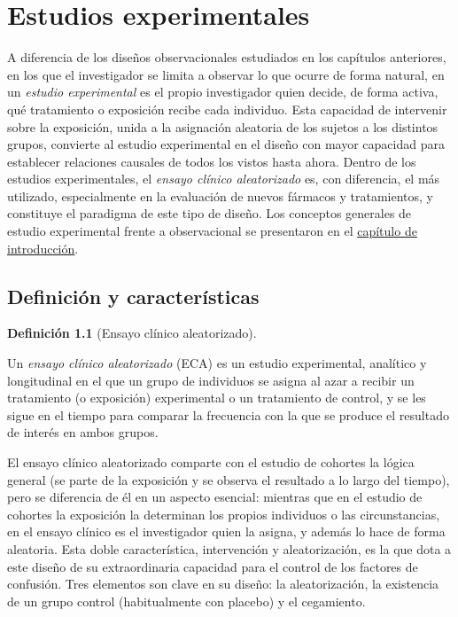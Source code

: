\documentclass[
  spanish,
  a4paper,
]{scrreport}
\theoremstyle{definition}
\theoremstyle{definition}
\newtheorem{definition}{Definición}[chapter]
\theoremstyle{remark}
\begin{document}
\chapter{Estudios experimentales}\label{estudios-experimentales}

A diferencia de los diseños observacionales estudiados en los capítulos
anteriores, en los que el investigador se limita a observar lo que
ocurre de forma natural, en un \emph{estudio experimental} es el propio
investigador quien decide, de forma activa, qué tratamiento o exposición
recibe cada individuo. Esta capacidad de intervenir sobre la exposición,
unida a la asignación aleatoria de los sujetos a los distintos grupos,
convierte al estudio experimental en el diseño con mayor capacidad para
establecer relaciones causales de todos los vistos hasta ahora. Dentro
de los estudios experimentales, el \emph{ensayo clínico aleatorizado}
es, con diferencia, el más utilizado, especialmente en la evaluación de
nuevos fármacos y tratamientos, y constituye el paradigma de este tipo
de diseño. Los conceptos generales de estudio experimental frente a
observacional se presentaron en el
\hyperref[introducciuxf3n-a-los-tipos-de-estudios-estaduxedsticos]{capítulo
de introducción}.

\section{Definición y
características}\label{definiciuxf3n-y-caracteruxedsticas-5}

\begin{definition}[Ensayo clínico
aleatorizado]\protect\hypertarget{def-experimentales-ensayo-clinico-aleatorizado}{}\label{def-experimentales-ensayo-clinico-aleatorizado}

Un \emph{ensayo clínico aleatorizado} (ECA) es un estudio experimental,
analítico y longitudinal en el que un grupo de individuos se asigna al
azar a recibir un tratamiento (o exposición) experimental o un
tratamiento de control, y se les sigue en el tiempo para comparar la
frecuencia con la que se produce el resultado de interés en ambos
grupos.

\end{definition}

El ensayo clínico aleatorizado comparte con el estudio de cohortes la
lógica general (se parte de la exposición y se observa el resultado a lo
largo del tiempo), pero se diferencia de él en un aspecto esencial:
mientras que en el estudio de cohortes la exposición la determinan los
propios individuos o las circunstancias, en el ensayo clínico es el
investigador quien la asigna, y además lo hace de forma aleatoria. Esta
doble característica, intervención y aleatorización, es la que dota a
este diseño de su extraordinaria capacidad para el control de los
factores de confusión. Tres elementos son clave en su diseño: la
aleatorización, la existencia de un grupo control (habitualmente con
placebo) y el cegamiento.
\end{document}
